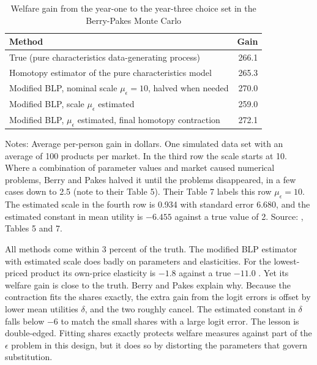 \begin{table}[htbp]
\centering
\caption{Welfare gain from the year-one to the year-three choice set in the Berry-Pakes Monte Carlo}
\label{tab:10-bp-welfare}
\small
\begin{tabular}{@{}lr@{}}
\toprule
Method & Gain \\
\midrule
True (pure characteristics data-generating process) & 266.1 \\
Homotopy estimator of the pure characteristics model & 265.3 \\
Modified BLP, nominal scale $\mu_\epsilon = 10$, halved when needed & 270.0 \\
Modified BLP, scale $\mu_\epsilon$ estimated & 259.0 \\
Modified BLP, $\mu_\epsilon$ estimated, final homotopy contraction & 272.1 \\
\bottomrule
\end{tabular}

\smallskip
\begin{minipage}{0.86\linewidth}
\footnotesize Notes: Average per-person gain in dollars. One simulated data set with an average of 100 products per
market. In the third row the scale starts at 10. Where a combination of parameter values and market caused
numerical problems, Berry and Pakes halved it until the problems disappeared, in a few cases down to 2.5 (note to
their Table 5). Their Table 7 labels this row $\mu_\epsilon = 10$. The estimated scale in the fourth row is 0.934
with standard error 6.680, and the estimated constant in mean utility is $-6.455$ against a true value of 2. Source:
\citet{BerryPakes2007}, Tables 5 and 7.
\end{minipage}
\end{table}

All methods come within 3 percent of the truth. The modified BLP estimator with estimated scale does badly on
parameters and elasticities. For the lowest-priced product its own-price elasticity is $-1.8$ against a true
$-11.0$ \citep[Table 6]{BerryPakes2007}. Yet its welfare gain is close to the truth. Berry and Pakes explain why.
Because the contraction fits the shares exactly, the extra gain from the logit errors is offset by lower mean
utilities $\delta$, and the two roughly cancel. The estimated constant in $\delta$ falls below $-6$ to match the
small shares with a large logit error. The lesson is double-edged. Fitting shares exactly protects welfare
measures against part of the $\epsilon$ problem in this design, but it does so by distorting the parameters that
govern substitution.

